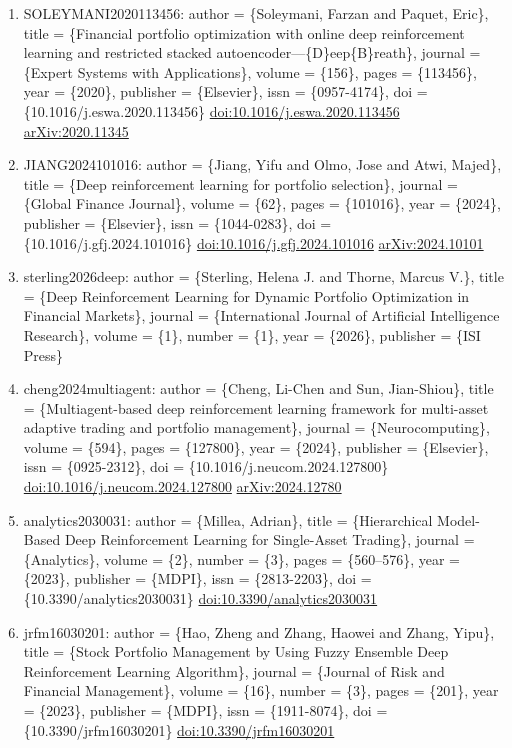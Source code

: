 \documentclass[11pt]{article}
\begin{document}
\begin{enumerate}[leftmargin=*]
  \item SOLEYMANI2020113456: author = \{Soleymani, Farzan and Paquet, Eric\}, title = \{Financial portfolio optimization with online deep reinforcement learning and restricted stacked autoencoder---\{D\}eep\{B\}reath\}, journal = \{Expert Systems with Applications\}, volume = \{156\}, pages = \{113456\}, year = \{2020\}, publisher = \{Elsevier\}, issn = \{0957-4174\}, doi = \{10.1016/j.eswa.2020.113456\} \href{https://doi.org/10.1016/j.eswa.2020.113456}{doi:10.1016/j.eswa.2020.113456} \href{https://arxiv.org/abs/2020.11345}{arXiv:2020.11345}
  \item JIANG2024101016: author = \{Jiang, Yifu and Olmo, Jose and Atwi, Majed\}, title = \{Deep reinforcement learning for portfolio selection\}, journal = \{Global Finance Journal\}, volume = \{62\}, pages = \{101016\}, year = \{2024\}, publisher = \{Elsevier\}, issn = \{1044-0283\}, doi = \{10.1016/j.gfj.2024.101016\} \href{https://doi.org/10.1016/j.gfj.2024.101016}{doi:10.1016/j.gfj.2024.101016} \href{https://arxiv.org/abs/2024.10101}{arXiv:2024.10101}
  \item sterling2026deep: author = \{Sterling, Helena J. and Thorne, Marcus V.\}, title = \{Deep Reinforcement Learning for Dynamic Portfolio Optimization in Financial Markets\}, journal = \{International Journal of Artificial Intelligence Research\}, volume = \{1\}, number = \{1\}, year = \{2026\}, publisher = \{ISI Press\}
  \item cheng2024multiagent: author = \{Cheng, Li-Chen and Sun, Jian-Shiou\}, title = \{Multiagent-based deep reinforcement learning framework for multi-asset adaptive trading and portfolio management\}, journal = \{Neurocomputing\}, volume = \{594\}, pages = \{127800\}, year = \{2024\}, publisher = \{Elsevier\}, issn = \{0925-2312\}, doi = \{10.1016/j.neucom.2024.127800\} \href{https://doi.org/10.1016/j.neucom.2024.127800}{doi:10.1016/j.neucom.2024.127800} \href{https://arxiv.org/abs/2024.12780}{arXiv:2024.12780}
  \item analytics2030031: author = \{Millea, Adrian\}, title = \{Hierarchical Model-Based Deep Reinforcement Learning for Single-Asset Trading\}, journal = \{Analytics\}, volume = \{2\}, number = \{3\}, pages = \{560--576\}, year = \{2023\}, publisher = \{MDPI\}, issn = \{2813-2203\}, doi = \{10.3390/analytics2030031\} \href{https://doi.org/10.3390/analytics2030031}{doi:10.3390/analytics2030031}
  \item jrfm16030201: author = \{Hao, Zheng and Zhang, Haowei and Zhang, Yipu\}, title = \{Stock Portfolio Management by Using Fuzzy Ensemble Deep Reinforcement Learning Algorithm\}, journal = \{Journal of Risk and Financial Management\}, volume = \{16\}, number = \{3\}, pages = \{201\}, year = \{2023\}, publisher = \{MDPI\}, issn = \{1911-8074\}, doi = \{10.3390/jrfm16030201\} \href{https://doi.org/10.3390/jrfm16030201}{doi:10.3390/jrfm16030201}

\end{enumerate}
\end{document}
